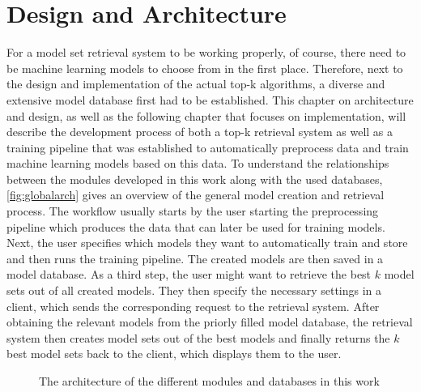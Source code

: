 \chapter{Design and Architecture} \label{chap:design}

For a model set retrieval system to be working properly, of course, there need to be machine learning models to choose from in the first place. Therefore, next to the design and implementation of the actual top-k algorithms, a diverse and extensive model database first had to be established. This chapter on architecture and design, as well as the following chapter that focuses on implementation, will describe the development process of both a top-k retrieval system as well as a training pipeline that was established to automatically preprocess data and train machine learning models based on this data. To understand the relationships between the modules developed in this work along with the used databases, \autoref{fig:globalarch} gives an overview of the general model creation and retrieval process. The workflow usually starts by the user starting the preprocessing pipeline which produces the data that can later be used for training models. Next, the user specifies which models they want to automatically train and store and then runs the training pipeline. The created models are then saved in a model database. As a third step, the user might want to retrieve the best $k$ model sets out of all created models. They then specify the necessary settings in a client, which sends the corresponding request to the retrieval system. After obtaining the relevant models from the priorly filled model database, the retrieval system then creates model sets out of the best models and finally returns the $k$ best model sets back to the client, which displays them to the user.

\begin{figure}[htbp]

  \caption{The architecture of the different modules and databases in this work}
  \label{fig:globalarch}
\end{figure}

